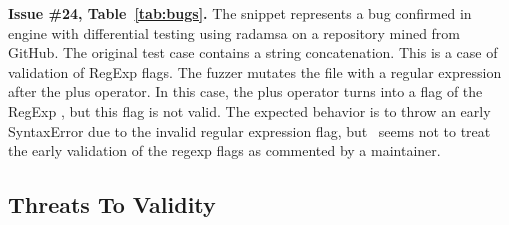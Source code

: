 \documentclass[smallextended]{svjour3}
\begin{document}





\vspace{1ex}\noindent\textbf{Issue \#24, Table~\ref{tab:bugs}.} The snippet
 represents a bug confirmed in \textbf{\hermes} engine with
differential testing using radamsa on a repository mined from GitHub.
The original test case contains a string concatenation.
This is a case of validation of RegExp flags. The fuzzer mutates
the file with a regular expression  after the plus operator.
In this case, the plus operator turns into a flag of the RegExp ,
but this flag is not valid. The expected behavior is to throw an early
SyntaxError due to the invalid regular expression flag,
but \hermes\ seems not to treat the early validation of the regexp flags
as commented by a maintainer.

\subsection{Threats To Validity}
\end{document}
